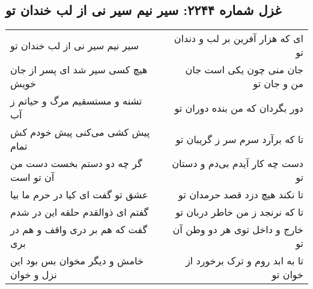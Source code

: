 \begin{center}
\section*{غزل شماره ۲۲۴۴: سیر نیم سیر نی از لب خندان تو}
\label{sec:2244}
\begin{longtable}{l p{0.5cm} r}
سیر نیم سیر نی از لب خندان تو
&&
ای که هزار آفرین بر لب و دندان تو
\\
هیچ کسی سیر شد ای پسر از جان خویش
&&
جان منی چون یکی است جان من و جان تو
\\
تشنه و مستسقیم مرگ و حیاتم ز آب
&&
دور بگردان که من بنده دوران تو
\\
پیش کشی می‌کنی پیش خودم کش تمام
&&
تا که برآرد سرم سر ز گریبان تو
\\
گر چه دو دستم بخست دست من آن تو است
&&
دست چه کار آیدم بی‌دم و دستان تو
\\
عشق تو گفت ای کیا در حرم ما بیا
&&
تا نکند هیچ دزد قصد حرمدان تو
\\
گفتم ای ذوالقدم حلقه این در شدم
&&
تا که نرنجد ز من خاطر دربان تو
\\
گفت که هم بر دری واقف و هم در بری
&&
خارج و داخل توی هر دو وطن آن تو
\\
خامش و دیگر مخوان بس بود این نزل و خوان
&&
تا به ابد روم و ترک برخورد از خوان تو
\\
\end{longtable}
\end{center}
